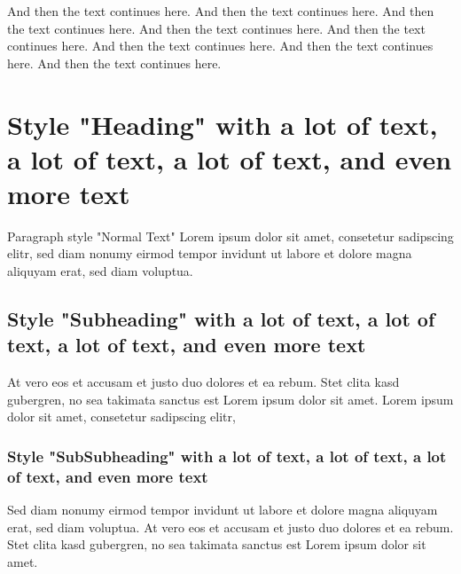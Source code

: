 And then the text continues here. And then the text continues
here. And then the text continues here. And then the text
continues here. And then the text continues here. And
then the text continues here. And then the text continues
here. And then the text continues here. 
\chapter{Style "Heading" with a lot of text, a lot of text, a lot of
text, and even more text}
Paragraph style "Normal Text" Lorem ipsum dolor sit amet,
consetetur sadipscing elitr, sed diam nonumy eirmod tempor invidunt
ut labore et dolore magna aliquyam erat, sed diam voluptua.
\section{Style "Subheading" with a lot of text, a lot of text, a
lot of text, and even more text}
At vero eos et accusam et justo duo dolores et ea rebum. Stet
clita kasd gubergren, no sea takimata sanctus est Lorem ipsum dolor
sit amet. Lorem ipsum dolor sit amet, consetetur sadipscing
elitr,
\subsection{Style "SubSubheading" with a lot of text, a lot of text, a
lot of text, and even more text}
Sed diam nonumy eirmod tempor invidunt ut labore et dolore magna
aliquyam erat, sed diam voluptua. At vero eos et accusam et justo
duo dolores et ea rebum. Stet clita kasd gubergren, no sea takimata
sanctus est Lorem ipsum dolor sit amet.
